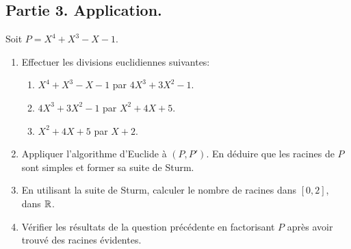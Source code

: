 \subsection*{Partie 3. Application.}
Soit $P = X^4 + X^3 - X -1$.
\begin{enumerate}
  \item Effectuer les divisions euclidiennes suivantes:
  \begin{enumerate}
    \item $X^4 + X ^3 - X - 1$ par $4X^3 + 3X^2 -1$.
    \item $4X^3 + 3X^2 -1$ par $X^2 + 4X +5$.
    \item $X^2 + 4X +5$ par $X + 2$.
  \end{enumerate}

  \item Appliquer l'algorithme d'Euclide à $(P, P')$. En déduire que les racines de $P$ sont simples et former sa suite de Sturm.
  \item En utilisant la suite de Sturm, calculer le nombre de racines dans $[0,2]$, dans $\mathbb{R}$.
  \item Vérifier les résultats de la question précédente en factorisant $P$ après avoir trouvé des racines évidentes.
\end{enumerate}

